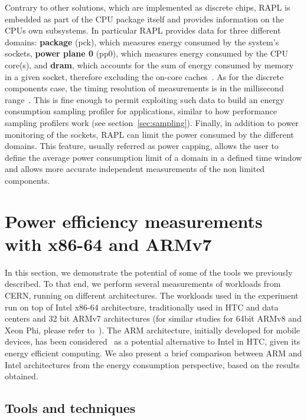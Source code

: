 Contrary to other solutions, which are implemented as discrete
chips, RAPL is embedded as part of the CPU package itself and
provides information on the CPUs own subsystems. In particular RAPL
provides data for three different domains: \textbf{package} (pck),
which measures energy consumed by the system's sockets, \textbf{power
plane 0} (pp0), which measures energy consumed by the CPU core(s),
and \textbf{dram}, which accounts for the sum of energy consumed
by memory in a given socket, therefore excluding the on-core
caches~\cite{INTELMAN}. As for the discrete components case, the
timing resolution of measurements is in the millisecond range~\cite{RAPL1}.
This is fine enough to permit exploiting such data to build an energy
consumption sampling profiler for applications, similar to how performance
sampling profilers work (see section~\ref{sec:sampling}).
Finally, in addition to power
monitoring of the sockets, RAPL can limit the power consumed by the
different domains. This feature, usually referred as power capping,
allows the user to define the average power consumption limit of a
domain in a defined time window and allows more accurate independent
measurements of the non limited components.




\section{Power efficiency measurements with x86-64 and ARMv7}

In this section, we demonstrate the potential of some of the
tools we previously described. To that end, we perform
several measurements of workloads from CERN, running on different
architectures. The workloads used in the experiment run on top of
Intel x86-64 architecture, traditionally used in HTC and data centers
and 32 bit ARMv7 architectures (for similar studies for 64bit ARMv8
and Xeon Phi, please refer to~\cite{ABD2014}). The ARM architecture,
initially developed for mobile devices, has been
considered~\cite{ACAT13ARM, CHEP13ARMPHI} as a potential alternative
to Intel in HTC, given its energy efficient computing. We also
present a brief comparison between ARM and Intel architectures from
the energy consumption perspective, based on the results obtained.

\subsection{Tools and techniques}

